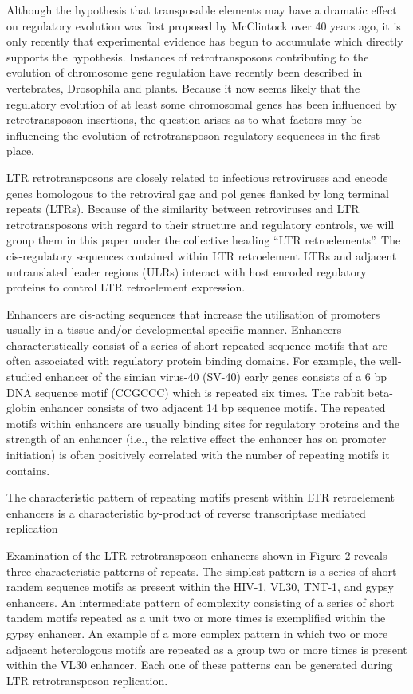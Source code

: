 Although the hypothesis that transposable elements may have a dramatic effect on regulatory evolution was first proposed by McClintock over 40 years ago, it is only recently that experimental evidence has begun to accumulate which directly supports the hypothesis. Instances of retrotransposons contributing to the evolution of chromosome gene regulation have recently been described in vertebrates, Drosophila and plants. Because it now seems likely that the regulatory evolution of at least some chromosomal genes has been influenced by retrotransposon insertions, the question arises as to what factors may be influencing the evolution of retrotransposon regulatory sequences in the first place.

LTR retrotransposons are closely related to infectious retroviruses and encode genes homologous to the retroviral gag and pol genes flanked by long terminal repeats (LTRs). Because of the similarity between retroviruses and LTR retrotransposons with regard to their structure and regulatory controls, we will group them in this paper under the collective heading “LTR retroelements”. The cis-regulatory sequences contained within LTR retroelement LTRs and adjacent untranslated leader regions (ULRs) interact with host encoded regulatory proteins to control LTR retroelement expression.

Enhancers are cis-acting sequences that increase the utilisation of promoters usually in a tissue and/or developmental specific manner. Enhancers characteristically consist of a series of short repeated sequence motifs that are often associated with regulatory protein binding domains. For example, the well-studied enhancer of the simian virus-40 (SV-40) early genes consists of a 6 bp DNA sequence motif (CCGCCC) which is repeated six times. The rabbit beta-globin enhancer consists of two adjacent 14 bp sequence motifs. The repeated motifs within enhancers are usually binding sites for regulatory proteins and the strength of an enhancer (i.e., the relative effect the enhancer has on promoter initiation) is often positively correlated with the number of repeating motifs it contains.

The characteristic pattern of repeating motifs present within LTR retroelement enhancers is a characteristic by-product of reverse transcriptase mediated replication

Examination of the LTR retrotransposon enhancers shown in Figure 2 reveals three characteristic patterns of repeats. The simplest pattern is a series of short randem sequence motifs as present within the HIV-1, VL30, TNT-1, and gypsy enhancers. An intermediate pattern of complexity consisting of a series of short tandem motifs repeated as a unit two or more times is exemplified within the gypsy enhancer. An example of a more complex pattern in which two or more adjacent heterologous motifs are repeated as a group two or more times is present within the VL30 enhancer. Each one of these patterns can be generated during LTR retrotransposon replication.

